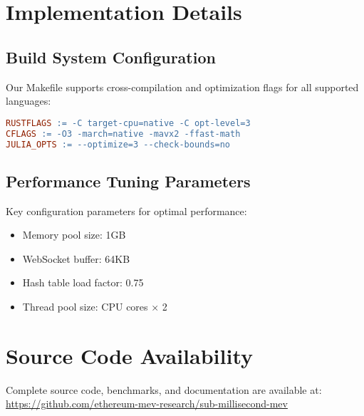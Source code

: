 \documentclass[12pt]{article}
\begin{document}
\section{Implementation Details}

\subsection{Build System Configuration}

Our Makefile supports cross-compilation and optimization flags for all supported languages:

\begin{lstlisting}[language=make]
RUSTFLAGS := -C target-cpu=native -C opt-level=3
CFLAGS := -O3 -march=native -mavx2 -ffast-math
JULIA_OPTS := --optimize=3 --check-bounds=no
\end{lstlisting}

\subsection{Performance Tuning Parameters}

Key configuration parameters for optimal performance:

\begin{itemize}
    \item Memory pool size: 1GB
    \item WebSocket buffer: 64KB
    \item Hash table load factor: 0.75
    \item Thread pool size: CPU cores × 2
\end{itemize}

\section{Source Code Availability}

Complete source code, benchmarks, and documentation are available at:
\url{https://github.com/ethereum-mev-research/sub-millisecond-mev}
\end{document}
